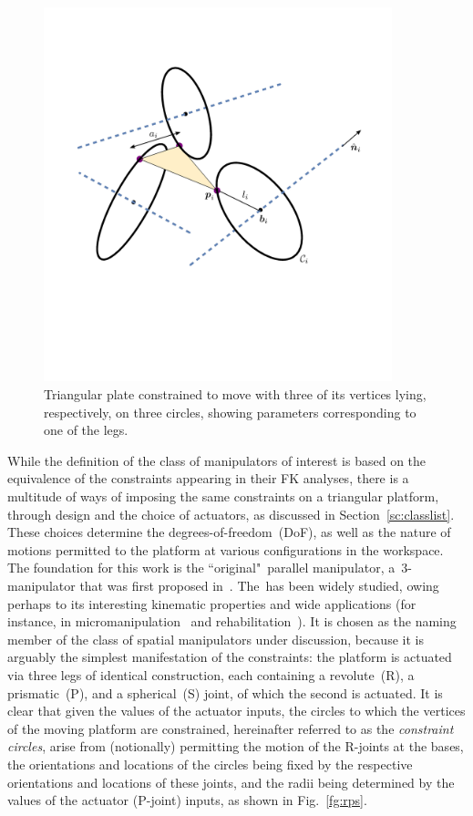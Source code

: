 \documentclass[DD]{iitmdiss}
\newcommand{\mref}[1]{\ref{#1}}
\newcommand{\mcite}[1]{\cite{#1}}
\newcommand{\mlabel}[1]{\label{#1}}
\begin{document}
\begin{figure}[h]	
	\centering
	\includegraphics[width=0.9\textwidth]{circs2.png}
	\caption{Triangular plate constrained to move with three of its vertices lying, respectively, on three circles, showing parameters corresponding to one of the legs.}
	\mlabel{fg:circs}
\end{figure}
While the definition of the class of manipulators of interest is based on the equivalence of the constraints appearing in their FK analyses, there is a multitude of ways of imposing the same constraints on a triangular platform, through design and the choice of actuators, as discussed in Section~\mref{sc:classlist}. These choices determine the degrees-of-freedom~(DoF), as well as the nature of motions permitted to the platform at various configurations in the workspace. \\ 
The foundation for this work is the ``original"~\rps parallel manipulator, a~3-\dofs manipulator that was first proposed in~\mcite{hunt1978}. The~\rps has been widely studied, owing perhaps to its interesting kinematic properties and wide applications (for instance, in micromanipulation~\mcite{zhao2017} and rehabilitation~\mcite{nurahmi2019}). It is chosen as the naming member of the class of spatial manipulators under discussion, because it is arguably the simplest manifestation of the constraints: the platform is actuated via three legs of identical construction, each containing a revolute~(R), a prismatic~(P), and a spherical~(S) joint, of which the second is actuated. It is clear that given the values of the actuator inputs, the circles to which the vertices of the moving platform are constrained, hereinafter referred to as the \emph{constraint circles}, arise from (notionally) permitting the motion of the R-joints at the bases, the orientations and locations of the circles being fixed by the respective orientations and locations of these joints, and the radii being determined by the values of the actuator (P-joint) inputs, as shown in Fig.~\mref{fg:rps}. \\
\end{document}
